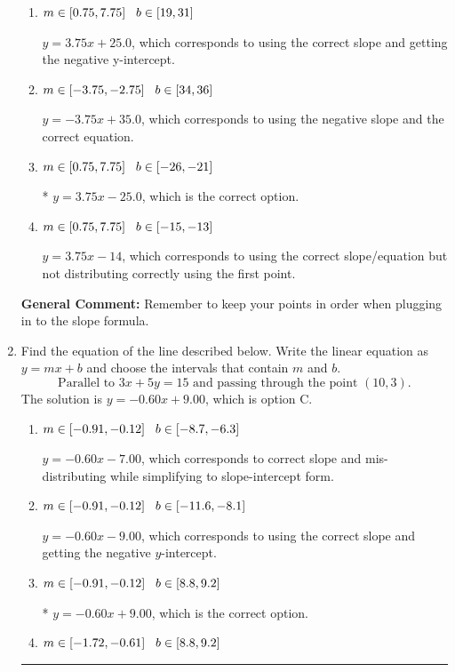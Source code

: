 \documentclass{extbook}[14pt]
\newcommand{\litem}[1]{\item #1

\rule{\textwidth}{0.4pt}}
\begin{document}
\begin{enumerate}
{\begin{enumerate}[label=\Alph*.]
 $y = 3.75x -3$, which corresponds to using the correct slope/equation but not distributing correctly using the second point.
\item \( m \in [0.75, 7.75] \hspace*{3mm} b \in [19, 31] \)

 $y = 3.75x + 25.0$, which corresponds to using the correct slope and getting the negative y-intercept.
\item \( m \in [-3.75, -2.75] \hspace*{3mm} b \in [34, 36] \)

 $y = -3.75x + 35.0$, which corresponds to using the negative slope and the correct equation.
\item \( m \in [0.75, 7.75] \hspace*{3mm} b \in [-26, -21] \)

* $y = 3.75x -25.0$, which is the correct option.
\item \( m \in [0.75, 7.75] \hspace*{3mm} b \in [-15, -13] \)

 $y = 3.75x -14$, which corresponds to using the correct slope/equation but not distributing correctly using the first point.
\end{enumerate}

\textbf{General Comment:} Remember to keep your points in order when plugging in to the slope formula.
}
\litem{
Find the equation of the line described below. Write the linear equation as $ y=mx+b $ and choose the intervals that contain $m$ and $b$.
\[ \text{Parallel to } 3 x + 5 y = 15 \text{ and passing through the point } (10, 3). \]The solution is \( y = -0.60x + 9.00 \), which is option C.\begin{enumerate}[label=\Alph*.]
\item \( m \in [-0.91, -0.12] \hspace*{3mm} b \in [-8.7, -6.3] \)

 $y = -0.60x - 7.00$, which corresponds to correct slope and mis-distributing while simplifying to slope-intercept form.
\item \( m \in [-0.91, -0.12] \hspace*{3mm} b \in [-11.6, -8.1] \)

 $y = -0.60x - 9.00$, which corresponds to using the correct slope and getting the negative $y$-intercept.
\item \( m \in [-0.91, -0.12] \hspace*{3mm} b \in [8.8, 9.2] \)

* $y = -0.60x + 9.00$, which is the correct option.
\item \( m \in [-1.72, -0.61] \hspace*{3mm} b \in [8.8, 9.2] \)


\end{enumerate}}
\end{enumerate}
\end{document}
